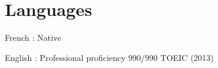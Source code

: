 \documentclass[11pt,a4paper,sans]{moderncv} %
\begin{document}


\section{Languages}

\cvitemwithcomment
    {}
    {French : Native}
    {}

    \cvitemwithcomment
    {}
    {English : Professional proficiency}
    {990/990  TOEIC (2013)}
\end{document}
